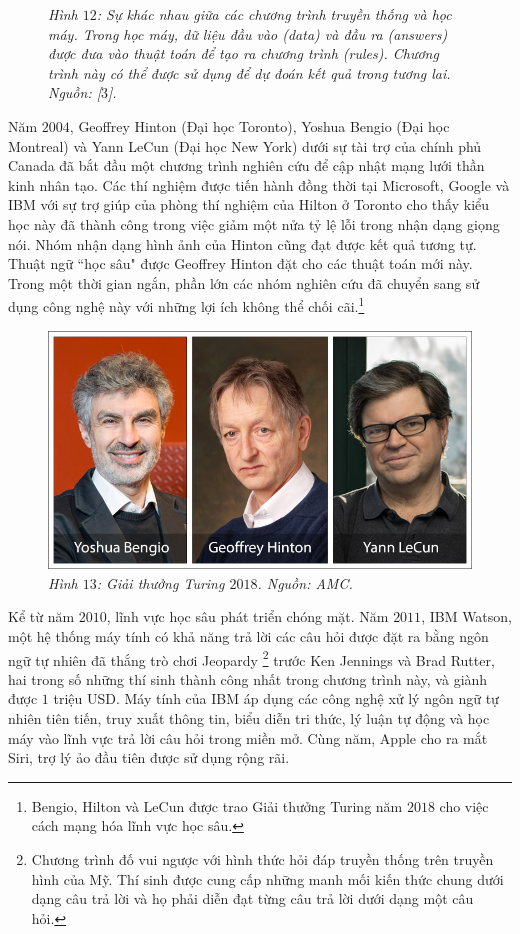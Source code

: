 \begin{multicols}{2}
\begin{figure}[H]
		\caption{\small\textit{\color{cackithi}Hình $12$: Sự khác nhau giữa các chương trình truyền thống và học máy. Trong học máy, dữ liệu đầu vào (data) và đầu ra (answers) được đưa vào thuật toán để tạo ra chương trình (rules). Chương trình này có thể được sử dụng để dự đoán kết quả trong tương lai. Nguồn: [$3$].}}
		\vspace*{-10pt}
	\end{figure}
	Năm $2004$, Geoffrey Hinton (Đại học Toronto), Yoshua Bengio (Đại học Montreal) và Yann LeCun (Đại học New York) dưới sự tài trợ của chính phủ Canada đã bắt đầu một chương trình nghiên cứu để cập nhật mạng lưới thần kinh nhân tạo. Các thí nghiệm được tiến hành đồng thời tại Microsoft, Google và IBM với sự trợ giúp của phòng thí nghiệm của Hilton ở Toronto cho thấy kiểu học này đã thành công trong việc giảm một nửa tỷ lệ lỗi trong nhận dạng giọng nói. Nhóm nhận dạng hình ảnh của Hinton cũng đạt được kết quả tương tự. Thuật ngữ ``học sâu" được Geoffrey Hinton đặt cho các thuật toán mới này. Trong một thời gian ngắn, phần lớn các nhóm nghiên cứu đã chuyển sang sử dụng công nghệ này với những lợi ích không thể chối cãi.\footnote{\color{cackithi}Bengio, Hilton và LeCun được trao Giải thưởng Turing năm $2018$ cho việc cách mạng hóa lĩnh vực học sâu.} 
	\begin{figure}[H]
		\vspace*{5pt}
		\centering
		\captionsetup{labelformat= empty, justification=centering}
		\includegraphics[width= 1\linewidth]{turing-2018-bengio-hinton-lecun.jpg}
		\caption{\small\textit{\color{cackithi}Hình $13$: Giải thưởng Turing $2018$. Nguồn: AMC.}}
		\vspace*{-15pt}
	\end{figure}
	Kể từ năm $2010$, lĩnh vực học sâu phát triển chóng mặt. 
	\vskip 0.1cm
	Năm $2011$, IBM Watson, một hệ thống máy tính có khả năng trả lời các câu hỏi được đặt ra bằng ngôn ngữ tự nhiên đã thắng trò chơi Jeopardy \footnote{\color{cackithi}Chương trình đố vui ngược với hình thức hỏi đáp truyền thống trên truyền hình của Mỹ. Thí sinh được cung cấp những manh mối kiến thức chung dưới dạng câu trả lời và họ phải diễn đạt từng câu trả lời dưới dạng một câu hỏi.} trước Ken Jennings và Brad Rutter, hai trong số những thí sinh thành công nhất trong chương trình này, và giành được $1$ triệu USD. Máy tính của IBM áp dụng các công nghệ xử lý ngôn ngữ tự nhiên tiên tiến, truy xuất thông tin, biểu diễn tri thức, lý luận tự động và học máy vào lĩnh vực trả lời câu hỏi trong miền mở. Cùng năm, Apple cho ra mắt Siri, trợ lý ảo đầu tiên được sử dụng rộng rãi.

\end{multicols}
